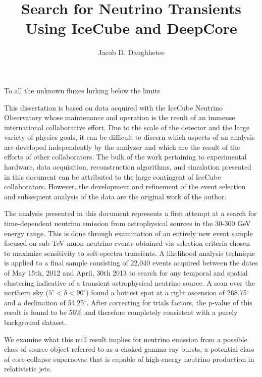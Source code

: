 \documentclass{gatech-thesis}
\title{Search for Neutrino Transients Using IceCube and DeepCore}
\author{Jacob D. Daughhetee}
\begin{document}

\begin{preliminary}

\begin{dedication}
\null\vfil
{\large
\begin{center}
To all the unknown fluxes lurking below the limits
\end{center}}
\vfil\null
\end{dedication}

\begin{preface}

	This dissertation is based on data acquired with the IceCube Neutrino Observatory whose maintenance and operation is the result of an immense international collaborative effort. Due to the scale of the detector and the large variety of physics goals, it can be difficult to discern which aspects of an analysis are developed independently by the analyzer and which are the result of the efforts of other collaborators. The bulk of the work pertaining to experimental hardware, data acquisition, reconstruction algorithms, and simulation presented in this document can be attributed to the large contingent of IceCube collaborators. However, the development and refinement of the event selection and subsequent analysis of the data are the original work of the author.

	The analysis presented in this document represents a first attempt at a search for time-dependent neutrino emission from astrophysical sources in the 30-300 GeV energy range. This is done through examination of an entirely new event sample focused on sub-TeV muon neutrino events obtained via selection criteria chosen to maximize sensitivity to soft-spectra transients. A likelihood analysis technique is applied to a final sample consisting of 22,040 events acquired between the dates of May 15th, 2012 and April, 30th 2013 to search for any temporal and spatial clustering indicative of a transient astrophysical neutrino source. A scan over the northern sky ($5^{\circ} < \delta < 90^{\circ}$) found a hottest spot at a right ascension of 268.75$^{\circ}$ and a declination of 54.25$^{\circ}$. After correcting for trials factors, the p-value of this result is found to be 56$\%$ and therefore completely consistent with a purely background dataset.
	
We examine what this null result implies for neutrino emission from a possible class of source object referred to as a choked gamma-ray bursts, a potential class of core-collapse supernovae that is capable of high-energy neutrino production in relativistic jets.


\end{preface}
\end{preliminary}
\end{document}
